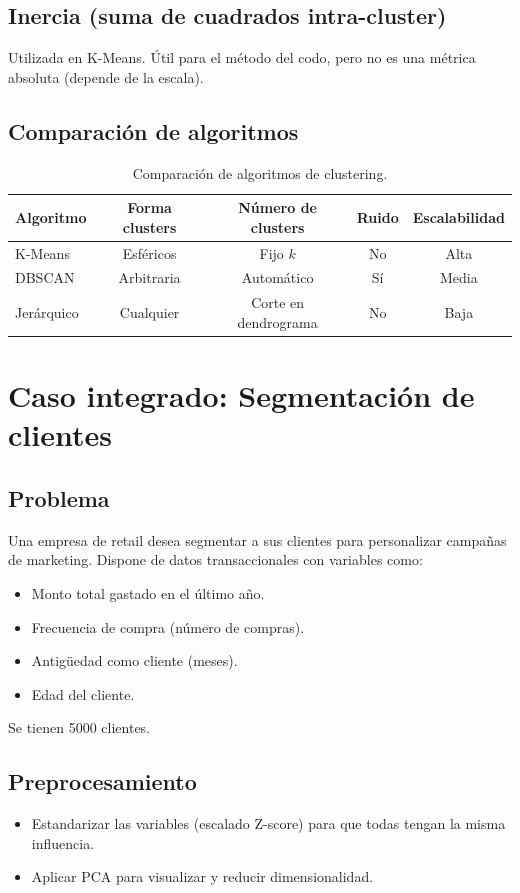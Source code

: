 \documentclass[12pt,a4paper,openany,oneside]{book}
\begin{document}
\subsection{Inercia (suma de cuadrados intra-cluster)}
Utilizada en K-Means. Útil para el método del codo, pero no es una métrica absoluta (depende de la escala).

\subsection{Comparación de algoritmos}
\begin{table}[h]
\centering
\begin{tabular}{|l|c|c|c|c|}
\hline
\textbf{Algoritmo} & \textbf{Forma clusters} & \textbf{Número de clusters} & \textbf{Ruido} & \textbf{Escalabilidad} \\
\hline
K-Means & Esféricos & Fijo \(k\) & No & Alta \\
DBSCAN & Arbitraria & Automático & Sí & Media \\
Jerárquico & Cualquier & Corte en dendrograma & No & Baja \\
\hline
\end{tabular}
\caption{Comparación de algoritmos de clustering.}
\end{table}

\section{Caso integrado: Segmentación de clientes}

\subsection{Problema}
Una empresa de retail desea segmentar a sus clientes para personalizar campañas de marketing. Dispone de datos transaccionales con variables como:
\begin{itemize}
    \item Monto total gastado en el último año.
    \item Frecuencia de compra (número de compras).
    \item Antigüedad como cliente (meses).
    \item Edad del cliente.
\end{itemize}
Se tienen 5000 clientes.

\subsection{Preprocesamiento}
\begin{itemize}
    \item Estandarizar las variables (escalado Z-score) para que todas tengan la misma influencia.
    \item Aplicar PCA para visualizar y reducir dimensionalidad.
\end{itemize}
\end{document}
